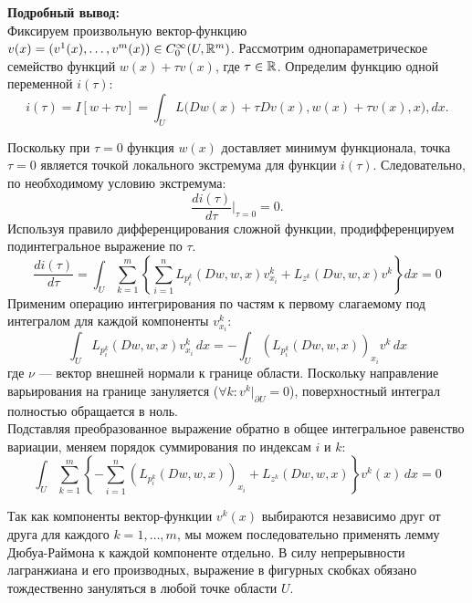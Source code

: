 \textbf{Подробный вывод:}\\
Фиксируем произвольную вектор-функцию 
$v(x) = (v^1(x), \dots, v^m(x)) \in C_0^\infty(U, \mathbb{R}^m)$. 
Рассмотрим однопараметрическое семейство функций $w(x) + \tau v(x)$, 
где $\tau \in \mathbb{R}$. 
Определим функцию одной переменной $i(\tau)$: 
\begin{equation}
i(\tau) = I[w + \tau v] = 
  \int_U L\big(Dw(x) + \tau Dv(x), w(x) + \tau v(x), x\big) , dx.
\end{equation}

Поскольку при $\tau = 0$ функция $w(x)$ доставляет минимум функционала, 
точка $\tau = 0$ является точкой локального экстремума для функции $i(\tau)$. 
Следовательно, по необходимому условию экстремума: 
\begin{equation}
\frac{di(\tau)}{d\tau} \bigg|_{\tau=0} = 0.
\end{equation}
Используя правило дифференцирования сложной функции, 
продифференцируем подинтегральное выражение по $\tau$. 
\begin{equation}
\frac{di(\tau)}{d\tau} = 
  \int_U \sum_{k=1}^m \left\{ 
    \sum_{i=1}^n L_{p_i^k}(Dw, w, x) v_{x_i}^k + L_{z^k}(Dw, w, x) v^k 
  \right\} dx = 0
\end{equation}
Применим операцию интегрирования по частям к первому слагаемому 
под интегралом для каждой компоненты $v_{x_i}^k$:
\begin{equation}
    \int_U L_{p_i^k}(Dw, w, x) v_{x_i}^k \, dx = 
     -\int_U (L_{p_i^k}(Dw, w, x))_{x_i} v^k \, dx
\end{equation}
где $\nu$ --- вектор внешней нормали к границе области. 
Поскольку направление варьирования на границе зануляется 
($\forall k \colon v^k|_{\partial U} = 0$), поверхностный интеграл полностью 
обращается в ноль.\\
Подставляя преобразованное выражение обратно в общее интегральное равенство 
вариации, меняем порядок суммирования по индексам $i$ и $k$:
\begin{equation}
    \int_U \sum_{k=1}^m \left\{ - \sum_{i=1}^n (L_{p_i^k}(Dw, w, x))_{x_i} + L_{z^k}(Dw, w, x) \right\} v^k(x) \, dx = 0
\end{equation}

Так как компоненты вектор-функции $v^k(x)$ выбираются независимо 
друг от друга для каждого $k = 1, \dots, m$, мы можем последовательно 
применять лемму Дюбуа-Раймона к каждой компоненте отдельно. 
В силу непрерывности лагранжиана и его производных, выражение в фигурных 
скобках обязано тождественно зануляться в любой точке области $U$.

